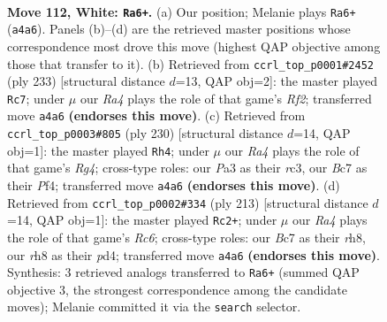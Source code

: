 \documentclass[11pt]{article}
\begin{document}
\clearpage

\begin{figure}[p]\centering
\begin{subfigure}{0.46\textwidth}\centering
\resizebox{\linewidth}{!}{%
\newchessgame
\chessboard[
  setfen={7r/2B5/7k/8/R6K/P7/8/8 w - - 16 112},
  showmover=false,
  pgfstyle=straightmove, color=movearrow, markmove={a4-a6}
]}
\caption{}
\end{subfigure}\hfill
\begin{subfigure}{0.46\textwidth}\centering
\resizebox{\linewidth}{!}{%
\newchessgame
\chessboard[
  setfen={8/p4r2/2B1R3/2b5/5k2/8/3K4/8 b - - 29 117},
  showmover=false,
  pgfstyle=straightmove, color=movearrow, markmove={f7-c7}
]}
\caption{}
\end{subfigure}
\\[4pt]
\begin{subfigure}{0.46\textwidth}\centering
\resizebox{\linewidth}{!}{%
\newchessgame
\chessboard[
  setfen={5k2/8/5PK1/8/5PR1/2r5/8/8 w - - 75 116},
  showmover=false,
  pgfstyle=straightmove, color=movearrow, markmove={g4-h4}
]}
\caption{}
\end{subfigure}\hfill
\begin{subfigure}{0.46\textwidth}\centering
\resizebox{\linewidth}{!}{%
\newchessgame
\chessboard[
  setfen={7R/8/8/8/2pPk3/2r5/5K2/8 b - - 5 107},
  showmover=false,
  pgfstyle=straightmove, color=movearrow, markmove={c3-c2}
]}
\caption{}
\end{subfigure}
\caption{\textbf{Move 112, White: \texttt{Ra6+}.} (a) Our position; Melanie plays \texttt{Ra6+} (\texttt{a4a6}). Panels (b)--(d) are the retrieved master positions whose correspondence most drove this move (highest QAP objective among those that transfer to it). (b) Retrieved from \texttt{ccrl\_top\_p0001\#2452} (ply 233) [structural distance $d$=13, QAP obj=2]: the master played \texttt{Rc7}; under $\mu$ our \emph{Ra4} plays the role of that game's \emph{Rf2}; transferred move \texttt{a4a6} \textbf{(endorses this move)}. (c) Retrieved from \texttt{ccrl\_top\_p0003\#805} (ply 230) [structural distance $d$=14, QAP obj=1]: the master played \texttt{Rh4}; under $\mu$ our \emph{Ra4} plays the role of that game's \emph{Rg4}; cross-type roles: our \emph{P}a3 as their \emph{r}c3, our \emph{B}c7 as their \emph{P}f4; transferred move \texttt{a4a6} \textbf{(endorses this move)}. (d) Retrieved from \texttt{ccrl\_top\_p0002\#334} (ply 213) [structural distance $d$=14, QAP obj=1]: the master played \texttt{Rc2+}; under $\mu$ our \emph{Ra4} plays the role of that game's \emph{Rc6}; cross-type roles: our \emph{B}c7 as their \emph{r}h8, our \emph{r}h8 as their \emph{p}d4; transferred move \texttt{a4a6} \textbf{(endorses this move)}. Synthesis: 3 retrieved analogs transferred to \texttt{Ra6+} (summed QAP objective 3, the strongest correspondence among the candidate moves); Melanie committed it via the \texttt{search} selector.}
\label{fig:thought-m222}
\end{figure}
\end{document}

